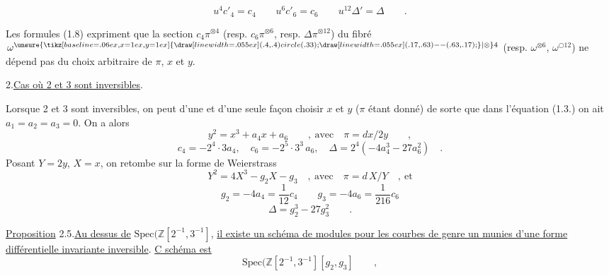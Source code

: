 \[
u^4c'_4=c_4\qquad u^6c'_6=c_6\qquad u^{12}\Delta'=\Delta\qquad .\tag*{(1.8)}
\]

Les formules (1.8) expriment que la section $c_4\pi^{\otimes4}$ (resp. $c_6\pi^{\otimes6}$, resp. $\Delta\pi^{\otimes12}$) du fibré $\omega^{\unsure{\tikz[baseline=.06ex,x=1ex,y=1ex]{\draw[line width=.055ex] (.4,.4) circle (.33); \draw[line width=.055ex] (.17,.63)--(.63,.17);}|\otimes}4}$ (resp. $\omega^{\otimes6}$, $\omega^{\bigcirc12}$) ne dépend pas du choix arbitraire de $\pi$, $x$ et $y$.

2.\qquad \uline{Cas où 2 et 3 sont inversibles}.

Lorsque 2 et 3 sont inversibles, on peut d'une et d'une seule façon choisir $x$ et $y$ ($\pi$ étant donné) de sorte que dans l'équation (1.3.) on ait $a_1=a_2=a_3=0$. On a alors
\[
y^2=x^3+a_4x+a_6\qquad,\ \text{avec}\quad\pi=dx/2y\qquad,\tag*{(2.1)}
\]
\[
c_4=-2^4\cdot3a_4,\quad c_6=-2^5\cdot3^3\,a_6,\quad\Delta=2^4(-4a_4^3-27a_6^2)\quad .\tag*{(2.2)}
\]
Posant $Y=2y$, $X=x$, on retombe sur la forme de Weierstrass
\[
Y^2=4X^3-g_2X-g_3\quad,\ \text{avec}\quad\pi=d\,X/Y\quad,\ \text{et}\tag*{(2.3)}
\]
\[
g_2=-4a_4=\frac{1}{12}c_4\qquad g_3=-4a_6=\frac{1}{216}c_6\tag*{(2.4)}
\]
\[
\Delta=g_2^3-27g_3^2\qquad .
\]

\uline{Proposition} 2.5.\qquad \uline{Au dessus de} $\mathrm{Spec}(\mathbb Z[2^{-1},3^{-1}]$, \uline{il existe un schéma de modules pour les courbes de genre un munies d'une forme différentielle invariante inversible}. \uline{C schéma est}
\[
\mathrm{Spec}(\mathbb Z[2^{-1},3^{-1}][g_2,g_3]\qquad ,
\]
